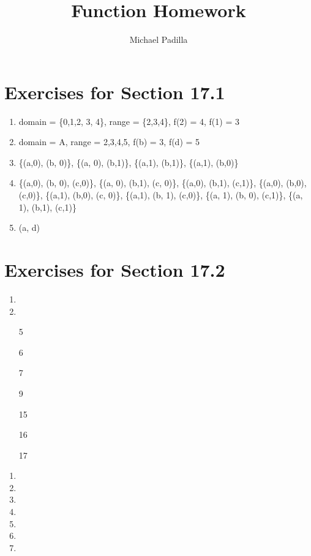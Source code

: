\documentclass[12pt]{article}
\title{Function Homework}
\author{Michael Padilla}
\begin{document}
 
\maketitle
\section*{Exercises for Section 17.1}
\begin{enumerate}
    \item domain = \{0,1,2, 3, 4\}, range = \{2,3,4\}, f(2) = 4, f(1) = 3
    \item domain = A, range = {2,3,4,5}, f(b) = 3, f(d) = 5
    \item  \{(a,0), (b, 0)\}, \{(a, 0), (b,1)\}, \{(a,1), (b,1)\}, \{(a,1), (b,0)\}
    \item \{(a,0), (b, 0), (c,0)\}, \{(a, 0), (b,1), (c, 0)\}, \{(a,0), (b,1), (c,1)\}, \{(a,0), (b,0), (c,0)\}, \{(a,1), (b,0), (c, 0)\}, \{(a,1), (b, 1), (c,0)\}, \{(a, 1), (b, 0), (c,1)\}, \{(a, 1), (b,1), (c,1)\} 
    \item  {(a, d)}
\end{enumerate}
\section*{Exercises for Section 17.2}
\begin{enumerate}
	\item 
	\item 
	\item [5]
	\item [6]
	\item [7]
	\item [9]
	\item [15]
	\item [16]
	\item [17]
\end{enumerate}
\begin{enumerate}
	\item 
	\item 
	\item 
	\item 
	\item 
	\item 
	\item 
\end{enumerate}
\end{document}
